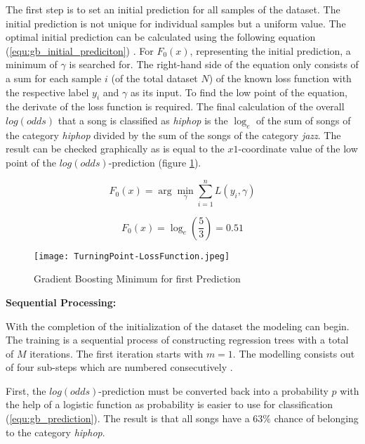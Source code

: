 The first step is to set an initial prediction for all samples of the dataset. The initial 
prediction is not unique for individual samples but a uniform value. The optimal initial 
prediction can be calculated using the following equation (\ref{equ:gb_initial_prediciton}) \cite[p.361]{Hastie_2009}. For \(F_{0}(x)\), representing the 
initial prediction, a minimum of \(\gamma \) is searched for. The right-hand side of the equation 
only consists of a sum for each sample \(i\) (of the total dataset \(N\)) of the known loss function 
with the respective label \(y_{i}\) and \(\gamma \) as its input. To find the low point of the equation, 
the derivate of the loss function is required. The final calculation of the overall \(log (odds)\) 
that a song is classified as \emph{hiphop} is the \(\log_{e}\) of the sum of songs of the category \emph{hiphop}
divided by the sum of the songs of the category \emph{jazz}. The result can be checked graphically 
as is equal to the \(x1\)-coordinate value of the low point of the \(log(odds)\)-prediction (figure \ref{fig:gb_turning_point-loss_function}). 

\begin{equation}
    F_{0}(x) = \arg \min_{\gamma } \sum_{i= 1}^{n} L(y_{i}, \gamma)
    \label{equ:gb_initial_prediciton}
\end{equation}

\begin{equation*}
    F_{0}(x) = \log_{e}(\frac{5}{3}) = 0.51
\end{equation*}

\begin{figure}[H]
    \centering
    \caption[]{Gradient Boosting Minimum for first Prediction}
	\label{fig:gb_turning_point-loss_function}
    \texttt{[image: TurningPoint-LossFunction.jpeg]}
\end{figure}

\textbf{Sequential Processing:}

With the completion of the initialization of the dataset the modeling can begin. The training is a sequential 
process of constructing regression trees with a total of \(M\) iterations. The first iteration 
starts with \(m = 1\). The modelling consists out of four sub-steps which are numbered consecutively \cite[p.1198]{Friedman_2001}.

First, the \(log(odds)\)-prediction must be converted back into a probability \(p\) with the help of a 
logistic function as probability is easier to use for classification (\ref{equ:gb_prediction}). The result is 
that all songs have a \(63\%\) chance of belonging to the category \emph{hiphop}.

